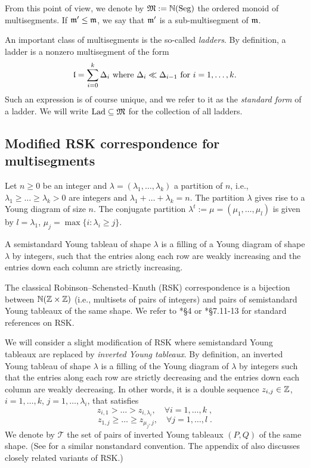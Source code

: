 \documentclass{ert-l} %
\begin{document}
From this point of view, we denote by $\mathfrak{M}:= \mathbb{N}(\operatorname{Seg})$ the ordered monoid of multisegments. If $\mathfrak{m}'\le\mathfrak{m}$, we say that $\mathfrak{m}'$ is a sub-multisegment of $\mathfrak{m}$.

An important class of multisegments is the so-called \emph{ladders}.
By definition, a ladder is a nonzero multisegment of the form
\[
\mathfrak{l}=\sum_{i=0}^k\Delta_i\text{ where }\Delta_i\ll\Delta_{i-1}\text{ for }i=1,\dots,k.
\]
Such an expression is of course unique, and we refer to it as the \emph{standard form} of a ladder.
We will write $\operatorname{Lad}\subseteq \mathfrak{M}$ for the collection of all ladders.



\subsection{Modified RSK correspondence for multisegments} \label{sec: Vien}

Let $n\ge0$ be an integer and $\lambda=(\lambda_1,\dots,\lambda_k)$ a partition of $n$,
i.e., $\lambda_1\ge\dots\geq \lambda_k>0$ are integers and $\lambda_1+\dots+\lambda_k=n$.
The partition $\lambda$ gives rise to a Young diagram of size $n$.
The conjugate partition $\lambda^t:=\mu=(\mu_1,\dots,\mu_l)$ is given by $l=\lambda_1$, $\mu_j=\max\{i:\lambda_i\ge j\}$.

A semistandard Young tableau of shape $\lambda$ is a filling of a Young diagram of shape $\lambda$
by integers, such that the entries along each row are weakly increasing and the entries down each column are strictly increasing.

The classical Robinson--Schensted--Knuth (RSK) correspondence is a bijection between
$\mathbb{N}(\mathbb{Z}\times\mathbb{Z})$ (i.e., multisets of pairs of integers) and
pairs of semistandard Young tableaux of the same shape.
We refer to \cite{MR1464693}*{\S4} or \cite{MR1676282}*{\S7.11-13} for standard references on RSK.

We will consider a slight modification of RSK where semistandard Young tableaux are replaced
by \textit{inverted Young tableaux}.
By definition, an inverted Young tableau of shape $\lambda$ is a filling of
the Young diagram of $\lambda$ by integers
such that the entries along each row are strictly decreasing and the entries down each column are weakly decreasing.
In other words, it is a double sequence $z_{i,j}\in\mathbb{Z}$, $i=1,\dots,k$, $j=1,\dots,\lambda_i$,
that satisfies
\[
z_{i,1}>\dots> z_{i,\lambda_i},\quad\forall i=1,\dots,k\;,
\]
\[
z_{1,j}\ge\dots\ge z_{\mu_j,j},\quad \forall j=1,\dots,l\;.
\]
We denote by $\mathcal{T}$ the set of pairs of inverted Young tableaux $(P,Q)$ of the same shape.
(See \cite{MR2979579} for a similar nonstandard convention.
The appendix of \cite{MR1464693} also discusses closely related variants of RSK.)
\end{document}
